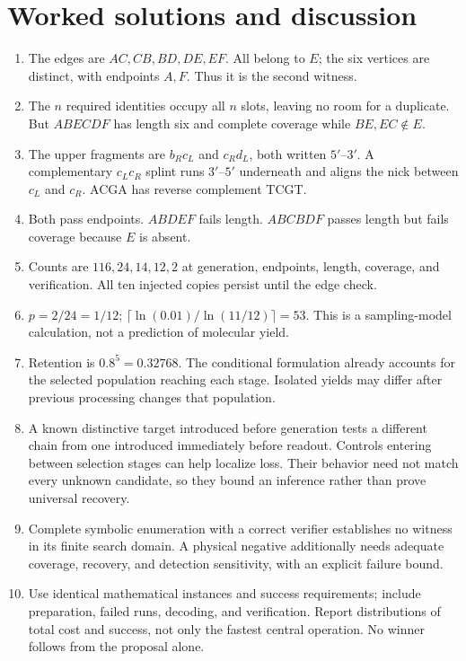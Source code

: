 \section{Worked solutions and discussion}\label{sec:solutions}
\begin{enumerate}
\item The edges are $AC,CB,BD,DE,EF$. All belong to $E$; the six vertices are distinct, with endpoints $A,F$. Thus it is the second witness.
\item The $n$ required identities occupy all $n$ slots, leaving no room for a duplicate. But $ABECDF$ has length six and complete coverage while $BE,EC\notin E$.
\item The upper fragments are $b_Rc_L$ and $c_Rd_L$, both written $5'$--$3'$. A complementary $c_Lc_R$ splint runs $3'$--$5'$ underneath and aligns the nick between $c_L$ and $c_R$. ACGA has reverse complement TCGT.
\item Both pass endpoints. $ABDEF$ fails length. $ABCBDF$ passes length but fails coverage because $E$ is absent.
\item Counts are $116,24,14,12,2$ at generation, endpoints, length, coverage, and verification. All ten injected copies persist until the edge check.
\item $p=2/24=1/12$; $\lceil\ln(0.01)/\ln(11/12)\rceil=53$. This is a sampling-model calculation, not a prediction of molecular yield.
\item Retention is $0.8^5=0.32768$. The conditional formulation already accounts for the selected population reaching each stage. Isolated yields may differ after previous processing changes that population.
\item A known distinctive target introduced before generation tests a different chain from one introduced immediately before readout. Controls entering between selection stages can help localize loss. Their behavior need not match every unknown candidate, so they bound an inference rather than prove universal recovery.
\item Complete symbolic enumeration with a correct verifier establishes no witness in its finite search domain. A physical negative additionally needs adequate coverage, recovery, and detection sensitivity, with an explicit failure bound.
\item Use identical mathematical instances and success requirements; include preparation, failed runs, decoding, and verification. Report distributions of total cost and success, not only the fastest central operation. No winner follows from the proposal alone.
\end{enumerate}
